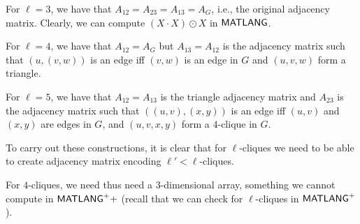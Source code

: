 For $\ell=3$, we have that $A_{12}=A_{23}=A_{13}=A_G$, i.e., the original adjacency matrix. Clearly, we can compute $(X\cdot X)\odot X$ in $\mathsf{MATLANG}$.

For $\ell=4$, we have that $A_{12}=A_G$ but $A_{13}=A_{12}$ is the adjacency matrix such that $(u,(v,w))$ is an edge iff $(v,w)$ is an edge in $G$ and
$(u,v,w)$ form a triangle.

For $\ell=5$, we have that $A_{12}=A_{13}$ is the triangle adjacency matrix and $A_{23}$ is the adjacency matrix such that $((u,v),(x,y))$ is an edge
iff $(u,v)$ and $(x,y)$ are edges in $G$, and $(u,v,x,y)$ form a $4$-clique in $G$.

To carry out these constructions, it is clear that for $\ell$-cliques we need to be able to create adjacency matrix encoding $\ell'<\ell$-cliques. 

For $4$-cliques, we need thus need a $3$-dimensional array, something we cannot compute in $\mathsf{MATLANG}^{\sf +}+$ (recall that we can check for $\ell$-cliques in $\mathsf{MATLANG}^{\sf +}$).

